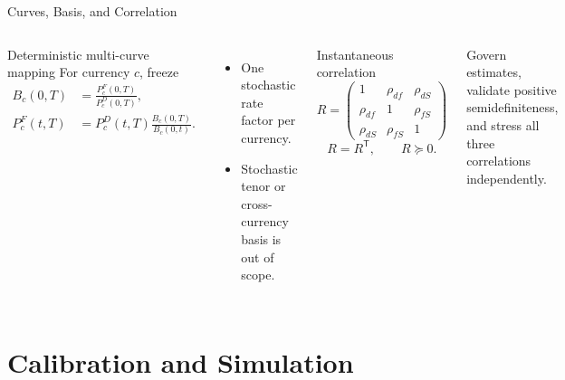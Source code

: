 \documentclass[aspectratio=169]{beamer}
\begin{document}
\begin{frame}{Curves, Basis, and Correlation}
  \begin{columns}[T,onlytextwidth]
      \begin{block}{Deterministic multi-curve mapping}
        For currency $c$, freeze
        \begin{align*}
          B_c(0,T)&=\frac{P_c^F(0,T)}{P_c^D(0,T)},\\
          P_c^F(t,T)&=P_c^D(t,T)\frac{B_c(0,T)}{B_c(0,t)}.
        \end{align*}
      \end{block}
      \begin{itemize}
        \item One stochastic rate factor per currency.
        \item Stochastic tenor or cross-currency basis is out of scope.
      \end{itemize}
      \begin{block}{Instantaneous correlation}
        \[
        R=\begin{pmatrix}
          1&\rho_{df}&\rho_{dS}\\
          \rho_{df}&1&\rho_{fS}\\
          \rho_{dS}&\rho_{fS}&1
        \end{pmatrix}
        \]
        \[
          R=R^{\mathsf T},\qquad R\succeq0.
        \]
      \end{block}
      Govern estimates, validate positive semidefiniteness, and stress all
      three correlations independently.
  \end{columns}
\end{frame}

\section{Calibration and Simulation}
\end{document}
